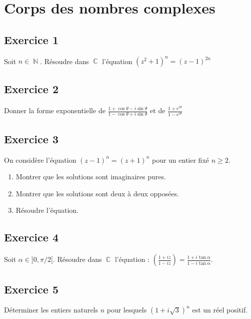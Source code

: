 \documentclass{article}
\DeclareMathOperator{\C}{\mathbb{C}}
\DeclareMathOperator{\N}{\mathbb{N}}
\begin{document}
\clearpage

\section{Corps des nombres complexes}

\subsection*{Exercice 1} 

Soit $n\in \N$. Résoudre dans $\C$ l'équation $(z^2+1)^n = (z-1)^{2n}$ 

\subsection*{Exercice 2} 

Donner la forme exponentielle de
$\displaystyle\frac{1+\cos{\theta} -i\sin{\theta}}{1-\cos{\theta}+i\sin{\theta}}$ et de $\displaystyle\frac{1+e^{i\theta}}{1-e^{i\theta}}$ 

\subsection*{Exercice 3} 

On considère l'équation $(z-1)^n = (z+1)^n$ pour un entier fixé $n\geqslant 2$. 

\begin{enumerate}
    \item Montrer que les solutions sont imaginaires pures. 
    \item Montrer que les solutions sont deux à deux opposées. 
    \item Résoudre l'équation. 
\end{enumerate}



\subsection*{Exercice 4} 

Soit $\alpha \in ]0, \pi/2[$. Résoudre dans $\C$ l'équation : $\displaystyle \left(\frac{1+iz}{1-iz}\right) = \frac{1+i\tan{\alpha}}{1-i\tan{\alpha}}$. 

\subsection*{Exercice 5} 

Déterminer les entiers naturels $n$ pour lesquels $(1+i\sqrt{3})^n$ est un réel positif. 
\end{document}
